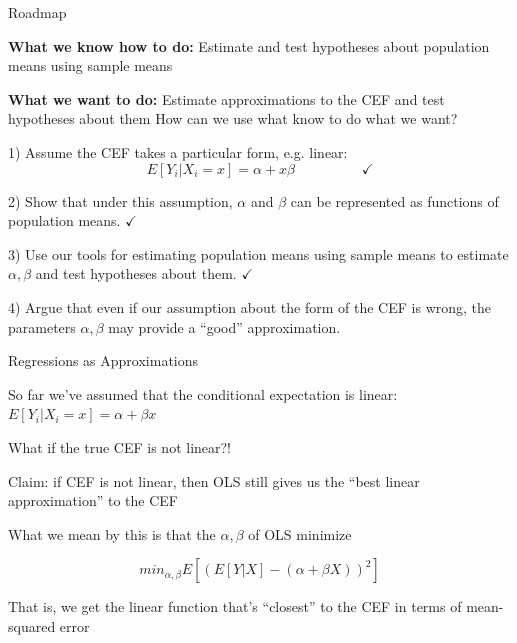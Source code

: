 \documentclass[11pt,english,handout]{beamer}
\newenvironment{wideitemize}{\itemize\addtolength{\itemsep}{10pt}}{\enditemize}
\begin{document}
\begin{frame}{Roadmap}
	\begin{wideitemize}
		\item \textbf{What we know how to do:} Estimate and test hypotheses about population means using sample means
		\item \textbf{What we want to do:} Estimate approximations to the CEF and test hypotheses about them 
	\end{wideitemize}
	\bigskip
	How can we use what know to do what we want? 
	
	\begin{wideitemize}
		\item 1) Assume the CEF takes a particular form, e.g. linear:
		$$E[Y_i | X_i = x] = \alpha + x \beta \hspace{2cm }\checkmark$$
		
		\item 2) Show that under this assumption, $\alpha$ and $\beta$ can be represented as functions of population means. $\checkmark$
		
		\item
		3) Use our tools for estimating population means using sample means to estimate $\alpha,\beta$ and test hypotheses about them. $\checkmark$
		
		\item
		4) Argue that even if our assumption about the form of the CEF is wrong, the parameters $\alpha,\beta$ may provide a ``good'' approximation.
	\end{wideitemize}
	
\end{frame}



\begin{frame}{Regressions as Approximations}
	\begin{wideitemize}
	\item
	So far we've assumed that the conditional expectation is linear: $E[Y_i | X_i = x]  = \alpha + \beta x$
	
	\item
	What if the true CEF is not linear?!
	
	\pause
	\item
	Claim: if CEF is not linear, then OLS still gives us the ``best linear approximation'' to the CEF 
	\pause 
	\item
	 What we mean by this is that the $\alpha,\beta$ of OLS minimize
	 
	 $$min_{\alpha,\beta} E[ (E[Y|X]  - (\alpha + \beta X) )^2 ]$$
	 
	 \pause
	 That is, we get the linear function that's ``closest'' to the CEF in terms of mean-squared error
	\end{wideitemize}
\end{frame}
\end{document}
